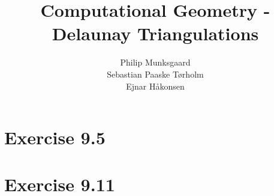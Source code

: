 \documentclass[11pt,a4paper]{article}
\title{Computational Geometry - Delaunay Triangulations}
\author{Philip Munksgaard \\ Sebastian Paaske Tørholm \\ Ejnar Håkonsen}
\begin{document}
\maketitle

\section{Exercise 9.5}

\section{Exercise 9.11}
\end{document}
